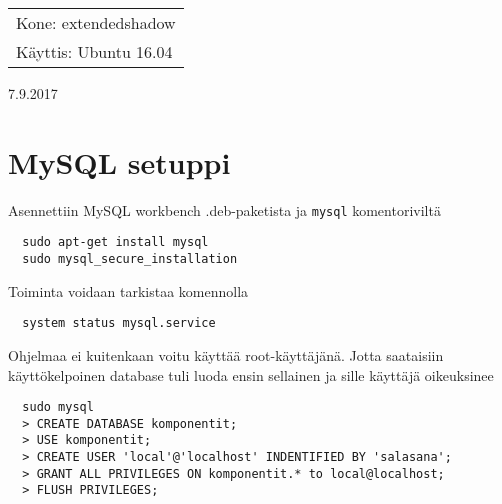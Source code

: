 \documentclass[main.tex]{subfiles}
\begin{document}
\thispagestyle{empty}
\begin{tabular}[t]{l}
Kone: extendedshadow\\
Käyttis: Ubuntu 16.04
\end{tabular}
\hfill 7.9.2017

\section{MySQL setuppi}

Asennettiin MySQL workbench .deb-paketista ja \texttt{mysql} komentoriviltä

\begin{lstlisting}
  sudo apt-get install mysql
  sudo mysql_secure_installation
\end{lstlisting}

Toiminta voidaan tarkistaa komennolla

\begin{lstlisting}
  system status mysql.service
\end{lstlisting}

Ohjelmaa ei kuitenkaan voitu käyttää root-käyttäjänä. Jotta saataisiin käyttökelpoinen database tuli luoda ensin sellainen ja sille käyttäjä oikeuksinee

\begin{lstlisting}
  sudo mysql
  > CREATE DATABASE komponentit;
  > USE komponentit;
  > CREATE USER 'local'@'localhost' INDENTIFIED BY 'salasana';
  > GRANT ALL PRIVILEGES ON komponentit.* to local@localhost;
  > FLUSH PRIVILEGES;
\end{lstlisting}
\end{document}
